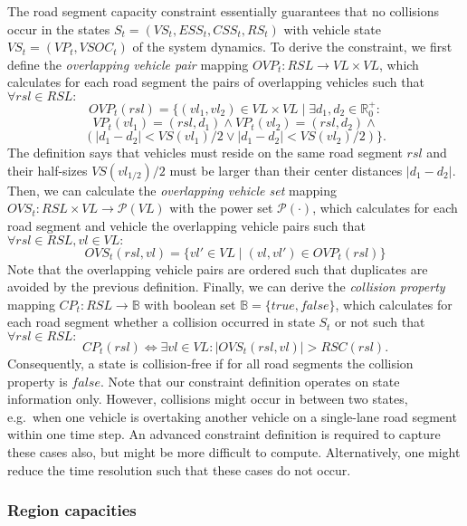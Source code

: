 The road segment capacity constraint essentially guarantees that no collisions occur in the states $S_t = (VS_t, ESS_t, CSS_t, RS_t)$ with vehicle state $VS_t = (VP_t, VSOC_t)$ of the system dynamics. To derive the constraint, we first define the \textit{overlapping vehicle pair} mapping $OVP_t : RSL \rightarrow VL \times VL$, which calculates for each road segment the pairs of overlapping vehicles such that $\forall rsl \in RSL:$
\[
	OVP_t(rsl) = \{(vl_1, vl_2) \in VL \times VL \mid \exists d_1, d_2 \in \mathbb{R}_0^+:
\]
\[
	VP_t(vl_1) = (rsl, d_1) \wedge VP_t(vl_2) = (rsl, d_2) \wedge
\]
\[
	(|d_1 - d_2| < VS(vl_1) / 2 \vee |d_1 - d_2| < VS(vl_2) / 2) \} \textrm{.}
\]
The definition says that vehicles must reside on the same road segment $rsl$ and their half-sizes $VS(vl_{1/2}) / 2$ must be larger than their center distances $|d_1 - d_2|$. Then, we can calculate the \textit{overlapping vehicle set} mapping $OVS_t : RSL \times VL \rightarrow \mathcal{P}(VL)$ with the power set $\mathcal{P}(\cdot)$, which calculates for each road segment and vehicle the overlapping vehicle pairs such that $\forall rsl \in RSL, vl \in VL:$
\[
	OVS_t(rsl,vl) = \{vl' \in VL \mid (vl, vl') \in OVP_t(rsl)\}
\]
Note that the overlapping vehicle pairs are ordered such that duplicates are avoided by the previous definition. Finally, we can derive the \textit{collision property} mapping $CP_t : RSL \rightarrow \mathbb{B}$ with boolean set $\mathbb{B} = \{true, false\}$, which calculates for each road segment whether a collision occurred in state $S_t$ or not such that $\forall rsl \in RSL:$
\[
	CP_t(rsl) \Leftrightarrow \exists vl \in VL : |OVS_t(rsl, vl)| > RSC(rsl) \textrm{.}
\]
Consequently, a state is collision-free if for all road segments the collision property is $false$. Note that our constraint definition operates on state information only. However, collisions might occur in between two states, e.g.\ when one vehicle is overtaking another vehicle on a single-lane road segment within one time step. An advanced constraint definition is required to capture these cases also, but might be more difficult to compute. Alternatively, one might reduce the time resolution such that these cases do not occur.

\subsubsection{Region capacities}
\label{capacities}

